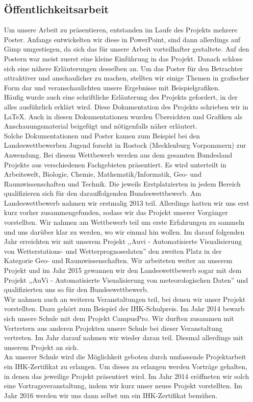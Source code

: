 \documentclass[a4paper,oneside,12pt,titlepage]{article}
\newcommand{\jf}{Jugend forscht }
\begin{document}
\subsection{Öffentlichkeitsarbeit} %
Um unsere Arbeit zu präsentieren, entstanden im Laufe des Projekts mehrere Poster. Anfangs entwickelten wir diese in PowerPoint, sind dann allerdings auf Gimp umgestiegen, da sich das für unsere Arbeit vorteilhafter gestaltete. Auf den Postern war meist zuerst eine kleine Einführung in das Projekt. Danach schloss sich eine nähere Erläuterungen desselben an. Um das Poster für den Betrachter attraktiver und anschaulicher zu machen, stellten wir einige Themen in grafischer Form dar und veranschaulichten unsere Ergebnisse mit Beispielgrafiken. \\
Häufig wurde auch eine schriftliche Erläuterung des Projekts gefordert, in der alles ausführlich erklärt wird. Diese Dokumentation des Projekts schrieben wir in \LaTeX . Auch in diesen Dokumentationen wurden Übersichten und Grafiken als Anschauungsmaterial beigefügt und nötigenfalls näher erläutert.\\
Solche Dokumentationen und Poster kamen zum Beispiel bei den Landeswettbewerben \jf in Rostock (Mecklenburg Vorpommern) zur Anwendung. Bei diesem Wettbewerb werden aus dem gesamten Bundesland Projekte aus verschiedenen Fachgebieten präsentiert. Es wird unterteilt in Arbeitswelt, Biologie, Chemie, Mathematik/Informatik, Geo- und Raumwissenschaften und Technik. Die jeweils Erstplatzierten in jedem Bereich qualifizieren sich für den darauffolgenden Bundeswettbewerb. Am Landeswettbewerb nahmen wir erstmalig 2013 teil. Allerdings hatten wir uns erst kurz vorher zusammengefunden, sodass wir das Projekt unserer Vorgänger vorstellten. Wir nahmen am Wettbewerb teil um erste Erfahrungen zu sammeln und uns darüber klar zu werden, wo wir einmal hin wollen. Im darauf folgenden Jahr erreichten wir mit unserem Projekt ,,Auvi - Automatisierte Visualisierung von Wetterstations- und Wetterprognosedaten'' den zweiten Platz in der Kategorie Geo- und Raumwissenschaften. Wir arbeiteten weiter an unserem Projekt und im Jahr 2015 gewannen wir den Landeswettbewerb sogar mit dem Projekt ,,AuVi - Automatisierte Visualisierung von meteorologischen Daten'' und qualifizierten uns so für den Bundeswettbewerb.\\
Wir nahmen auch an weiteren Veranstaltungen teil, bei denen wir unser Projekt vorstellten. Dazu gehört zum Beispiel der IHK-Schulpreis. Im Jahr 2014 bewarb sich unsere Schule mit dem Projekt CampusPro. Wir durften zusammen mit Vertretern aus anderen Projekten unsere Schule bei dieser Veranstaltung vertreten. Im Jahr darauf nahmen wir wieder daran teil. Diesmal allerdings mit unserem Projekt an sich.\\
An unserer Schule wird die Möglichkeit geboten durch umfassende Projektarbeit ein IHK-Zertifikat zu erlangen. Um dieses zu erlangen werden Vorträge gehalten, in denen das jeweilige Projekt präsentiert wird. Im Jahr 2014 eröffneten wir solch eine Vortragsveranstaltung, indem wir kurz unser neues Projekt vorstellten. Im Jahr 2016 werden wir uns dann selbst um ein IHK-Zertifikat bemühen.
\end{document}
